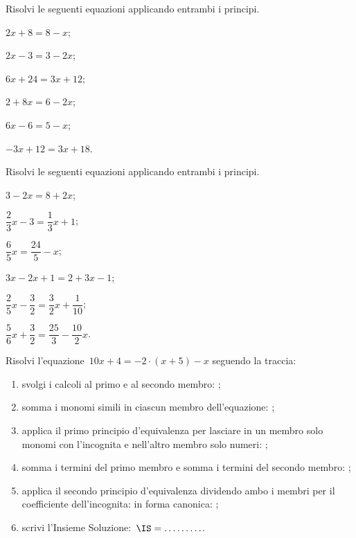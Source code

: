\begin{esercizio}
\label{ese:15.10}
Risolvi le seguenti equazioni applicando entrambi i principi.
\begin{multicols}{3}
\begin{enumeratea}
\spazielenx
 \item $2x+8=8-x$;
 \item $2x-3=3-2x$;
 \item $6x+24=3x+12$;
 \item $2+8x=6-2x$;
 \item $6x-6=5-x$;
 \item $-3x+12=3x+18$.
\end{enumeratea}
\end{multicols}
\end{esercizio}

\begin{esercizio}
\label{ese:15.11}
Risolvi le seguenti equazioni applicando entrambi i principi.
\begin{multicols}{3}
\begin{enumeratea}
\spazielenx
 \item $3-2x=8+2x$;
 \item $\dfrac{2}{3}x-3=\dfrac{1}{3}x+1$;
 \item $\dfrac{6}{5}x=\dfrac{24}{5}-x$;
 \item $3x-2x+1=2+3x-1$;
 \item $\dfrac{2}{5}x-\dfrac{3}{2}=\dfrac{3}{2}x+\dfrac{1}{10}$;
 \item $\dfrac{5}{6}x+\dfrac{3}{2}=\dfrac{25}{3}-\dfrac{10}{2}x$.
\end{enumeratea}
\end{multicols}
\end{esercizio}

\begin{esercizio}
\label{ese:15.12}
Risolvi l'equazione~$10x+4=-2\cdot (x+5)-x$ seguendo la traccia:
\begin{enumerate}
\spazielenx
 \item svolgi i calcoli al primo e al secondo membro: \dotfill;
 \item somma i monomi simili in ciascun membro dell'equazione: \dotfill;
 \item applica il primo principio d'equivalenza per lasciare in un membro solo monomi con l'incognita e nell'altro membro solo numeri: \dotfill;
 \item somma i termini del primo membro e somma i termini del secondo membro: \dotfill;
 \item applica il secondo principio d'equivalenza dividendo ambo i membri per il coefficiente dell'incognita: \dotfill in forma canonica: \dotfill;
 \item scrivi l'Insieme Soluzione:~$\IS = \ldots \ldots \ldots$.
\end{enumerate}
\end{esercizio}

